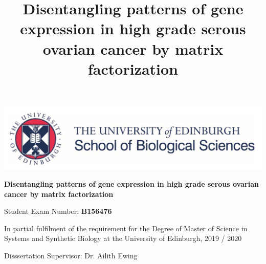 \documentclass[draft,tikz, 12pt,a4paper,oneside,fleqn]{article}
\title{Disentangling patterns of gene expression in high grade serous ovarian cancer by matrix factorization}
\author{}
\begin{document}
\begin{center}
\begin{center}
\includegraphics[scale=0.3]{images/UoE_SBO_logo.png}
\end{center}

\vspace{0.3in}

\begin{mdframed}
\begin{center}
\huge
\vspace{0.3in}
\bf
Disentangling patterns of gene expression in high grade serous ovarian cancer by matrix factorization
\vspace{0.2in}
\end{center}
\vspace{0.2in}
\end{mdframed}

\vspace{0.3in}

\begin{mdframed}
\begin{center}
\large
\vspace{0.2in}
Student Exam Number: \bf{B156476}
\vspace{0.2in}
\end{center}
\end{mdframed}

\vspace{0.3in}

\begin{mdframed}
\begin{center}
\large
\vspace{0.2in}
In partial fulfilment of the requirement for the Degree of
Master of Science in Systems and Synthetic Biology at the
University of Edinburgh,
2019 / 2020
\vspace{0.2in}
\end{center}
\end{mdframed}

\vspace{0.3in}

\begin{mdframed}
\begin{center}
\large
\vspace{0.2in}

Disssertation Supervisor:  Dr. Ailith Ewing
\vspace{0.2in}
\end{center}
\end{mdframed}
\end{center}
\end{document}
